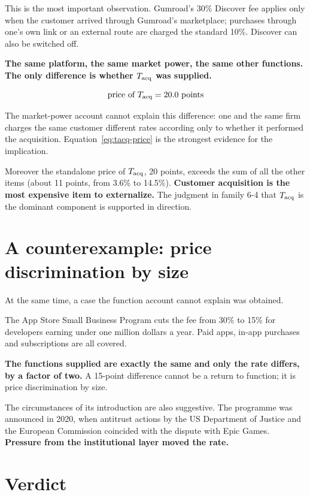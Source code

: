 This is the most important observation. Gumroad's 30\% Discover fee applies only when the
customer arrived through Gumroad's marketplace; purchases through one's own link or an
external route are charged the standard 10\%. Discover can also be switched off.

\textbf{The same platform, the same market power, the same other functions. The only
difference is whether $T_{\rm acq}$ was supplied.}

\begin{equation}
\text{price of } T_{\rm acq} = 20.0\ \text{points}
\label{eq:tacq-price}
\end{equation}

The market-power account cannot explain this difference: one and the same firm charges the
same customer different rates according only to whether it performed the acquisition.
Equation~\eqref{eq:tacq-price} is the strongest evidence for the implication.

Moreover the standalone price of $T_{\rm acq}$, 20 points, exceeds the sum of all the other
items (about 11 points, from 3.6\% to 14.5\%).
\textbf{Customer acquisition is the most expensive item to externalize.} The judgment in
family 6-4 that $T_{\rm acq}$ is the dominant component is supported in direction.

\section{A counterexample: price discrimination by size}

At the same time, a case the function account cannot explain was obtained.

The App Store Small Business Program cuts the fee from 30\% to 15\% for developers earning
under one million dollars a year. Paid apps, in-app purchases and subscriptions are all
covered.

\textbf{The functions supplied are exactly the same and only the rate differs, by a factor of
two.} A 15-point difference cannot be a return to function; it is price discrimination by
size.

The circumstances of its introduction are also suggestive. The programme was announced in
2020, when antitrust actions by the US Department of Justice and the European Commission
coincided with the dispute with Epic Games.
\textbf{Pressure from the institutional layer moved the rate.}

\section{Verdict}

